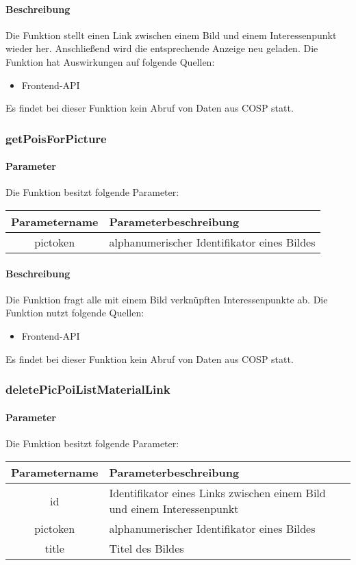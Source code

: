 \paragraph{Beschreibung} Die Funktion stellt einen Link zwischen einem Bild und einem Interessenpunkt wieder her. Anschließend wird die entsprechende Anzeige neu geladen. Die Funktion hat Auswirkungen auf folgende Quellen:
\begin{itemize}
	\item Frontend-API
\end{itemize}
Es findet bei dieser Funktion kein Abruf von Daten aus {\glqq COSP\grqq} statt.
\subsubsection{getPoisForPicture}
\paragraph{Parameter} Die Funktion besitzt folgende Parameter:
\begin{table}[H]
	\begin{tabular}{|c|p{11cm}|}
		\hline
		\textbf{Parametername} & \textbf{Parameterbeschreibung} \\ \hline
		pictoken & alphanumerischer Identifikator eines Bildes \\ \hline
	\end{tabular}
\end{table}
\paragraph{Beschreibung} Die Funktion fragt alle mit einem Bild verknüpften Interessenpunkte ab. Die Funktion nutzt folgende Quellen:
\begin{itemize}
	\item Frontend-API
\end{itemize}
Es findet bei dieser Funktion kein Abruf von Daten aus {\glqq COSP\grqq} statt.
\subsubsection{deletePicPoiListMaterialLink}
\paragraph{Parameter} Die Funktion besitzt folgende Parameter:
\begin{table}[H]
	\begin{tabular}{|c|p{11cm}|}
		\hline
		\textbf{Parametername} & \textbf{Parameterbeschreibung} \\ \hline
		id       & Identifikator eines Links zwischen einem Bild und einem Interessenpunkt \\ \hline
		pictoken & alphanumerischer Identifikator eines Bildes \\ \hline
		title    & Titel des Bildes \\ \hline
	\end{tabular}
\end{table}
